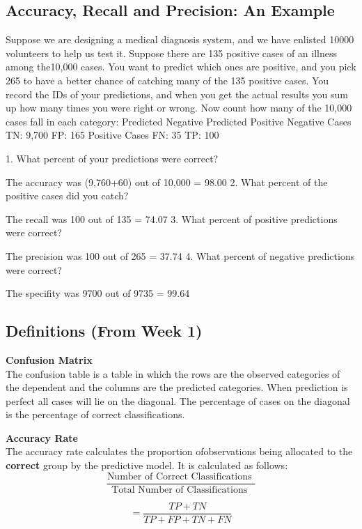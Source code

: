\documentclass[a4paper,12pt]{article}
\begin{document}
\subsection{Accuracy, Recall and Precision: An Example}
Suppose we are designing a medical diagnosis system, and we have enlisted 10000 volunteers to
help us test it. Suppose there are 135 positive cases of an illness among the10,000 cases. You want
to predict which ones are positive, and you pick 265 to have a better chance of catching many of
the 135 positive cases. You record the IDs of your predictions, and when you get the actual results
you sum up how many times you were right or wrong.
Now count how many of the 10,000 cases fall in each category:
Predicted Negative Predicted Positive
Negative Cases TN: 9,700 FP: 165
Positive Cases FN: 35 TP: 100


1. What percent of your predictions were correct?
\item  The accuracy was (9,760+60) out of 10,000 = 98.00%
2. What percent of the positive cases did you catch?
\item  The recall was 100 out of 135 = 74.07%
3. What percent of positive predictions were correct?
\item  The precision was 100 out of 265 = 37.74%
4. What percent of negative predictions were correct?
\item  The specifity was 9700 out of 9735 = 99.64%





\medskip
\subsection{Definitions (From Week 1)}
\textbf{Confusion Matrix} \\
The confusion
table is a table in which the rows are the observed categories of the dependent and
the columns are the predicted categories. When prediction is perfect all cases will lie on the
diagonal. The percentage of cases on the diagonal is the percentage of correct classifications. 

\textbf{Accuracy Rate}\\
The accuracy rate calculates the proportion ofobservations being allocated to the \textbf{correct} group by the predictive model. It is calculated as follows:
\[ \frac{
\mbox{Number of Correct Classifications }}{\mbox{Total Number of Classifications }} \]

\[ = \frac{TP + TN}{TP+FP+TN+FN}\]
\end{document}

